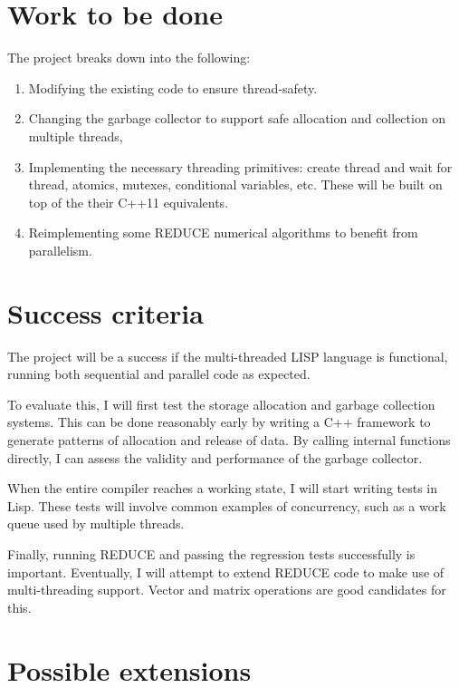 \documentclass[12pt,a4paper,twoside]{article}
\begin{document}
\section*{Work to be done}

The project breaks down into the following:

\begin{enumerate}

\item Modifying the existing code to ensure thread-safety.

\item Changing the garbage collector to support safe allocation and
collection on multiple threads,

\item Implementing the necessary threading primitives: create thread and
wait for thread, atomics, mutexes, conditional variables, etc.  These will be built on top
of the their C++11 equivalents.

\item Reimplementing some REDUCE numerical algorithms to benefit from parallelism.

\end{enumerate}

\section*{Success criteria}

The project will be a success if the multi-threaded LISP language is functional,
running both sequential and parallel code as expected.

To evaluate this, I will first test the storage allocation and garbage
collection systems. This can be done reasonably early by writing a C++ framework
to generate patterns of allocation and release of data. By calling  internal
functions directly, I can assess the validity and performance of the
garbage collector.

When the entire compiler reaches a working state, I will start writing tests
in Lisp. These tests will involve common examples of concurrency, such as a
work queue used by multiple threads.

Finally, running REDUCE and passing the regression tests successfully is
important. Eventually, I will attempt to extend REDUCE code to make use
of multi-threading support. Vector and matrix operations are good candidates
for this.

\section*{Possible extensions}
\end{document}
